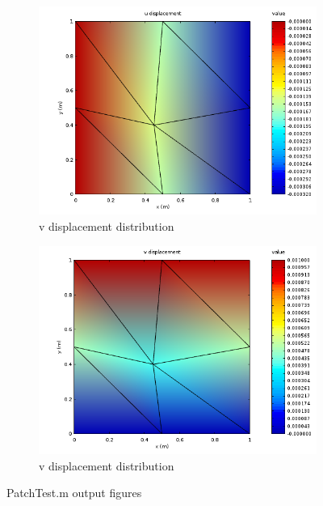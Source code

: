 \documentclass[paper=letter, fontsize=11pt]{scrartcl} %
\numberwithin{equation}{section} %
\numberwithin{figure}{section} %
\numberwithin{table}{section} %
\begin{document}
\begin{figure}[h]
\centering
	\begin{subfigure}[b]{0.45\textwidth}
		\includegraphics[width=\textwidth]{patchu.png}
		\caption{v displacement distribution}
		\label{fig:patchu}
	\end{subfigure}
	\hfill
	\begin{subfigure}[b]{0.45\textwidth}
		\includegraphics[width=\textwidth]{patchv.png}
		\caption{v displacement distribution}
		\label{fig:patchv}
	\end{subfigure}
	\caption{PatchTest.m output figures}
\end{figure}
\end{document}
